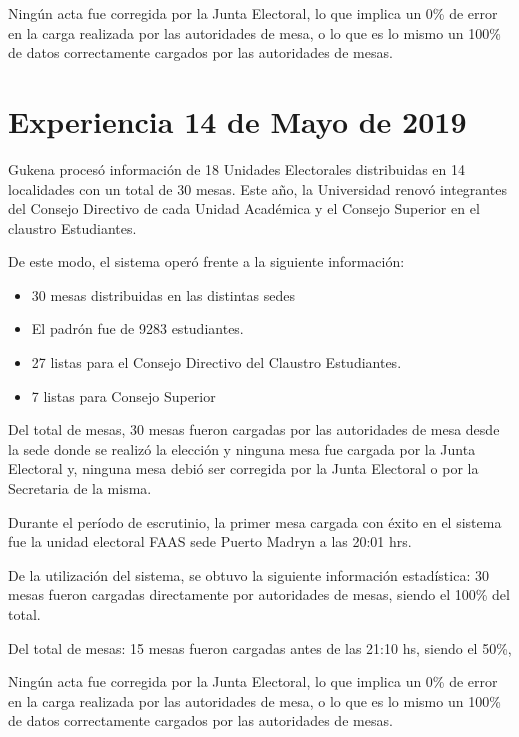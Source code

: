 Ningún acta fue corregida por la Junta Electoral, lo que implica un 0\% de error en la carga realizada por las autoridades de mesa, o lo que es lo mismo un 100\% de datos correctamente cargados por las autoridades de mesas.

\section{Experiencia 14 de Mayo de 2019}
Gukena procesó información de 18 Unidades Electorales distribuidas en 14 localidades con un total de 30 mesas. Este año, la Universidad renovó integrantes del Consejo Directivo de cada Unidad Académica y el Consejo Superior en el claustro Estudiantes.

De este modo, el sistema operó frente a la siguiente información:
\begin{itemize}
    \item 30 mesas distribuidas en las distintas sedes
     \item El padrón fue de  9283 estudiantes.
     \item 27 listas para el Consejo Directivo del Claustro Estudiantes.
     \item 7 listas para Consejo Superior
\end{itemize}
Del total de mesas, 30 mesas fueron cargadas por las autoridades de mesa desde la sede donde se realizó la elección y ninguna mesa fue cargada por la Junta Electoral y, ninguna mesa debió ser corregida por la Junta Electoral o por la Secretaria de la misma.

Durante el período de escrutinio, la primer mesa cargada con éxito en el sistema fue la unidad electoral FAAS sede Puerto Madryn a las 20:01 hrs.

De la utilización del sistema, se obtuvo la siguiente información estadística:
30 mesas fueron cargadas directamente por autoridades de mesas, siendo el 100\% del total.

Del total de mesas:
15 mesas fueron cargadas antes de las 21:10 hs, siendo el 50\%,

Ningún acta fue corregida por la Junta Electoral, lo que implica un 0\% de error en la carga realizada por las autoridades de mesa, o lo que es lo mismo un 100\% de datos correctamente cargados por las autoridades de mesas.

